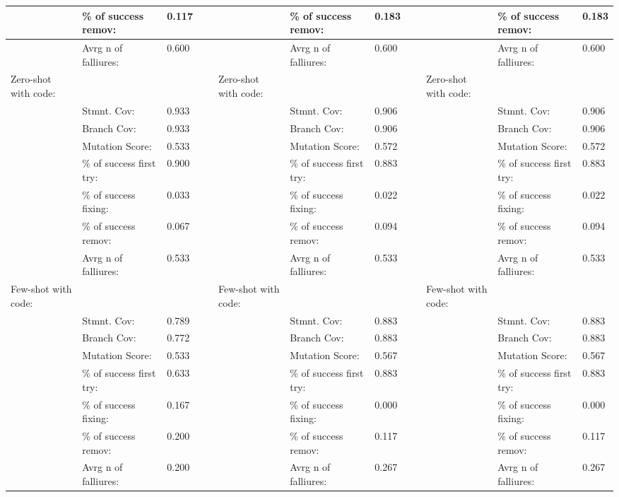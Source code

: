 \documentclass[a4paper,11pt,oneside]{memoir}
\begin{document}
\begin{table}[!ht]
{\begin{tabular}{|l|l|l|l|l|l|l|l|l|l|l|}
        ~ & \% of success remov: & 0.117 & ~ & ~ & \% of success remov: & 0.183 & ~ & ~ & \% of success remov: & 0.183 \\ \hline
        ~ & Avrg n of falliures: & 0.600 & ~ & ~ & Avrg n of falliures: & 0.600 & ~ & ~ & Avrg n of falliures: & 0.600 \\ \hline
        Zero-shot with code: & ~ & ~ & ~ & Zero-shot with code: & ~ & ~ & ~ & Zero-shot with code: & ~ & ~ \\ \hline
        ~ & Stmnt. Cov: & 0.933 & ~ & ~ & Stmnt. Cov: & 0.906 & ~ & ~ & Stmnt. Cov: & 0.906 \\ \hline
        ~ & Branch Cov: & 0.933 & ~ & ~ & Branch Cov: & 0.906 & ~ & ~ & Branch Cov: & 0.906 \\ \hline
        ~ & Mutation Score: & 0.533 & ~ & ~ & Mutation Score: & 0.572 & ~ & ~ & Mutation Score: & 0.572 \\ \hline
        ~ & \% of success first try: & 0.900 & ~ & ~ & \% of success first try: & 0.883 & ~ & ~ & \% of success first try: & 0.883 \\ \hline
        ~ & \% of success fixing: & 0.033 & ~ & ~ & \% of success fixing: & 0.022 & ~ & ~ & \% of success fixing: & 0.022 \\ \hline
        ~ & \% of success remov: & 0.067 & ~ & ~ & \% of success remov: & 0.094 & ~ & ~ & \% of success remov: & 0.094 \\ \hline
        ~ & Avrg n of falliures: & 0.533 & ~ & ~ & Avrg n of falliures: & 0.533 & ~ & ~ & Avrg n of falliures: & 0.533 \\ \hline
        Few-shot with code: & ~ & ~ & ~ & Few-shot with code: & ~ & ~ & ~ & Few-shot with code: & ~ & ~ \\ \hline
        ~ & Stmnt. Cov: & 0.789 & ~ & ~ & Stmnt. Cov: & 0.883 & ~ & ~ & Stmnt. Cov: & 0.883 \\ \hline
        ~ & Branch Cov: & 0.772 & ~ & ~ & Branch Cov: & 0.883 & ~ & ~ & Branch Cov: & 0.883 \\ \hline
        ~ & Mutation Score: & 0.533 & ~ & ~ & Mutation Score: & 0.567 & ~ & ~ & Mutation Score: & 0.567 \\ \hline
        ~ & \% of success first try: & 0.633 & ~ & ~ & \% of success first try: & 0.883 & ~ & ~ & \% of success first try: & 0.883 \\ \hline
        ~ & \% of success fixing: & 0.167 & ~ & ~ & \% of success fixing: & 0.000 & ~ & ~ & \% of success fixing: & 0.000 \\ \hline
        ~ & \% of success remov: & 0.200 & ~ & ~ & \% of success remov: & 0.117 & ~ & ~ & \% of success remov: & 0.117 \\ \hline
        ~ & Avrg n of falliures: & 0.200 & ~ & ~ & Avrg n of falliures: & 0.267 & ~ & ~ & Avrg n of falliures: & 0.267 \\ \hline
    \end{tabular}}
\end{table}
\end{document}
